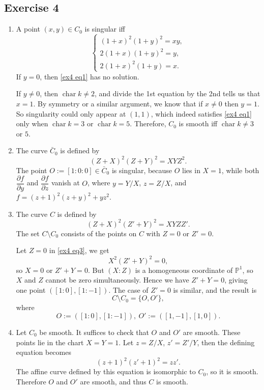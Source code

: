 \documentclass{article}
\theoremstyle{definition}
\theoremstyle{remark}
\renewcommand{\P}{\mathbb{P}}
\DeclareMathOperator{\cha}{char} %
\newcommand{\pdfrac}[2]{\dfrac{\partial #1}{\partial #2}} %
\begin{document}
\subsection*{Exercise 4}
\begin{enumerate}
\item A point $(x, y)\in C_0$ is singular iff \begin{equation}\label{ex4 eq1}
    \begin{cases}
        (1+x)^2(1+y)^2 = xy,\\
        2(1+x)(1+y)^2 = y,\\
        2(1+x)^2(1+y) = x.
    \end{cases}
\end{equation}
If $y = 0$, then \cref{ex4 eq1} has no solution.

If $y\ne 0$, then $\cha k \ne 2$, and divide the 1st equation by the 2nd tells us that $x = 1$. By symmetry or a similar argument, we know that if $x\ne 0$ then $y = 1$.
So singularity could only appear at $(1, 1)$, which indeed satisfies \cref{ex4 eq1} only when $\cha k = 3$ {\color{red} or $\cha k = 5$}.
Therefore, $C_0$ is smooth iff $\cha k \ne 3$ or $5$.

\item The curve $\bar{C}_0$ is defined by \[(Z+X)^2(Z+Y)^2 = XYZ^2.\]
The point $O := [1 : 0 : 0]\in\bar{C}_0$ is singular, because $O$ lies in $X = 1$, while both $\pdfrac{f}{y}$ and $\pdfrac{f}{z}$ vanish at $O$, where $y = Y/X$, $z = Z/X$, and $f = (z + 1)^2(z+y)^2 + yz^2$.

\item The curve $C$ is defined by \begin{equation}\label{ex4 eq3}
    (Z+X)^2(Z' + Y)^2 = XYZZ'.
\end{equation}
The set $C\setminus C_0$ consists of the points on $C$ with $Z = 0$ or $Z' = 0$.

Let $Z = 0$ in \cref{ex4 eq3}, we get \[X^2(Z' + Y)^2 = 0,\] so $X = 0$ or $Z' + Y = 0$. But $(X : Z)$ is a homogeneous coordinate of $\P^1$, so $X$ and $Z$ cannot be zero simultaneously. Hence we have $Z' + Y = 0$, giving one point $([1 : 0], [1 : -1])$. The case of $Z' = 0$ is similar, and the result is \[C\setminus C_0 = \{O, O'\},\]
where \[O := ([1 : 0], [1 : -1]),\ O' := ([1, -1], [1, 0]).\]

\item Let $C_0$ be smooth. It suffices to check that $O$ and $O'$ are smooth.
These points lie in the chart $X = Y = 1$. Let $z = Z/X$, $z' = Z'/Y$, then the defining equation becomes \begin{equation}\label{ex4 eq4}
    (z + 1)^2(z' + 1)^2 = zz'.
\end{equation}
The affine curve defined by this equation is isomorphic to $C_0$, so it is smooth. Therefore $O$ and $O'$ are smooth, and thus $C$ is smooth.


\end{enumerate}
\end{document}
